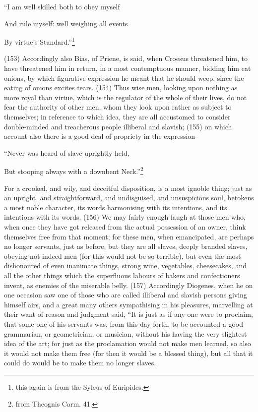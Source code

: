 ``I am well skilled both to obey myself

And rule myself: well weighing all events

By virtue's Standard.''\footnote{this again is from the Syleus of Euripides.}

(153) Accordingly also Bias, of Priene, is said, when Croesus threatened him, to have threatened
him in return, in a most contemptuous manner, bidding him eat onions, by which figurative
expression he meant that he should weep, since the eating of onions excites tears. (154) Thus
wise men, looking upon nothing as more royal than virtue, which is the regulator of the whole of
their lives, do not fear the authority of other men, whom they look upon rather as subject to
themselves; in reference to which idea, they are all accustomed to consider double-minded and
treacherous people illiberal and slavish; (155) on which account also there is a good deal of
propriety in the expression--

``Never was heard of slave uprightly held,

But stooping always with a downbent Neck.''\footnote{from Theognis Carm. 41.}

For a crooked, and wily, and deceitful disposition, is a most ignoble thing; just as an upright, and
straightforward, and undisguised, and unsuspicious soul, betokens a most noble character, its
words harmonising with its intentions, and its intentions with its words. (156) We may fairly enough
laugh at those men who, when once they have got released from the actual possession of an
owner, think themselves free from that moment; for these men, when emancipated, are perhaps no
longer servants, just as before, but they are all slaves, deeply branded slaves, obeying not indeed
men (for this would not be so terrible), but even the most dishonoured of even inanimate things,
strong wine, vegetables, cheesecakes, and all the other things which the superfluous labours of
bakers and confectioners invent, as enemies of the miserable belly. (157) Accordingly Diogenes,
when he on one occasion saw one of those who are called illiberal and slavish persons giving
himself airs, and a great many others sympathising in his pleasures, marvelling at their want of
reason and judgment said, ``It is just as if any one were to proclaim, that some one of his servants
was, from this day forth, to be accounted a good grammarian, or geometrician, or musician,
without his having the very slightest idea of the art; for just as the proclamation would not make
men learned, so also it would not make them free (for then it would be a blessed thing), but all that it
could do would be to make them no longer slaves.

